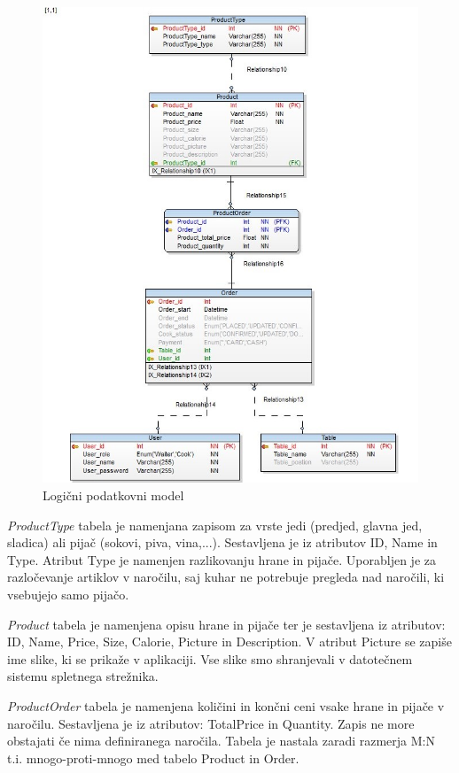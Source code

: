 \documentclass[a4paper, 12pt]{book}
\begin{document}
\begin{figure}[!htb]
\begin{center}
\includegraphics[width=12.5cm]{Database_physical}
\end{center}
\caption{Logični podatkovni model}
\label{Database_physical}
\end{figure}

\textit{ProductType} tabela je namenjana zapisom za vrste jedi (predjed, glavna jed, sladica) ali pijač (sokovi, piva, vina,...). Sestavljena je iz atributov ID, Name in Type. Atribut Type je namenjen razlikovanju hrane in pijače. Uporabljen je za razločevanje artiklov v naročilu, saj kuhar ne potrebuje pregleda nad naročili, ki vsebujejo samo pijačo. 

\textit{Product} tabela je namenjena opisu hrane in pijače ter je sestavljena iz atributov: ID, Name, Price, Size, Calorie, Picture in Description.  V atribut Picture se zapiše ime slike, ki se prikaže v aplikaciji. Vse slike smo shranjevali v datotečnem sistemu spletnega strežnika.

\textit{ProductOrder} tabela je namenjena količini in končni ceni vsake hrane in pijače v naročilu. Sestavljena je iz atributov: TotalPrice in Quantity. Zapis ne more obstajati če nima definiranega naročila. Tabela je nastala zaradi razmerja M:N t.i. mnogo-proti-mnogo med tabelo Product in Order.
\end{document}
